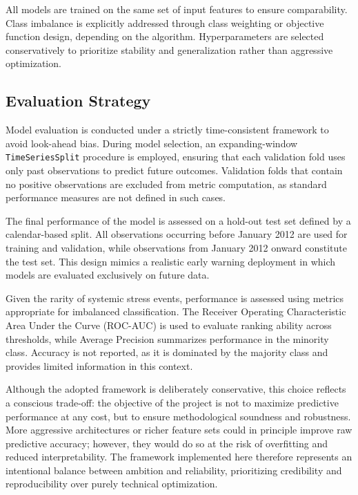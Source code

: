 \documentclass[11pt,a4paper]{article}
\begin{document}
All models are trained on the same set of input features to ensure comparability. Class imbalance is explicitly addressed through class weighting or objective function design, depending on the algorithm. Hyperparameters are selected conservatively to prioritize stability and generalization rather than aggressive optimization.

\subsection{Evaluation Strategy}
\label{subsec:evaluation}

Model evaluation is conducted under a strictly time-consistent framework to avoid look-ahead bias. During model selection, an expanding-window \texttt{TimeSeriesSplit} procedure is employed, ensuring that each validation fold uses only past observations to predict future outcomes. Validation folds that contain no positive observations are excluded from metric computation, as standard performance measures are not defined in such cases.

The final performance of the model is assessed on a hold-out test set defined by a calendar-based split. All observations occurring before January 2012 are used for training and validation, while observations from January 2012 onward constitute the test set. This design mimics a realistic early warning deployment in which models are evaluated exclusively on future data.

Given the rarity of systemic stress events, performance is assessed using metrics appropriate for imbalanced classification. The Receiver Operating Characteristic Area Under the Curve (ROC-AUC) is used to evaluate ranking ability across thresholds, while Average Precision summarizes performance in the minority class. Accuracy is not reported, as it is dominated by the majority class and provides limited information in this context.

Although the adopted framework is deliberately conservative, this choice reflects a conscious trade-off: the objective of the project is not to maximize predictive performance at any cost, but to ensure methodological soundness and robustness. More aggressive architectures or richer feature sets could in principle improve raw predictive accuracy; however, they would do so at the risk of overfitting and reduced interpretability. The framework implemented here therefore represents an intentional balance between ambition and reliability, prioritizing credibility and reproducibility over purely technical optimization.
\end{document}
